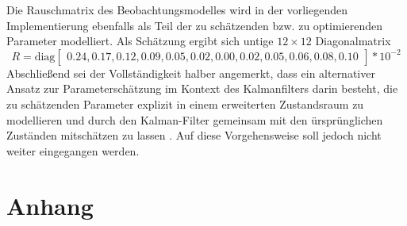 \documentclass[12pt,a4paper,headsepline,bibliography=totoc,listof=totoc,headinclude=false,footinclude=false,BCOR5mm]{scrreprt} %
\begin{document}
Die Rauschmatrix des Beobachtungsmodelles wird in der vorliegenden Implementierung ebenfalls als Teil der zu sch{\"a}tzenden bzw. zu optimierenden Parameter modelliert. Als Sch{\"a}tzung ergibt sich untige $12 \times 12$ Diagonalmatrix
\begin{equation}
R =  \text{diag}\begin{bmatrix}0.24, 0.17, 0.12, 0.09, 0.05, 0.02, 0.00, 0.02, 0.05, 0.06, 0.08, 0.10
  \end{bmatrix} *10^{-2}
\end{equation}
Abschlie{\ss}end sei der Vollst{\"a}ndigkeit halber angemerkt, dass ein alternativer Ansatz zur Parametersch{\"a}tzung im Kontext des Kalmanfilters darin besteht, die zu sch{\"a}tzenden Parameter explizit in einem erweiterten Zustandsraum zu modellieren und durch den Kalman-Filter gemeinsam mit den {\"u}rspr{\"u}nglichen Zust{\"a}nden mitsch{\"a}tzen zu lassen \cite[S. 83ff.]{Mazzoni2007}. Auf diese Vorgehensweise soll jedoch nicht weiter eingegangen werden.



\renewcommand\thechapter{}
\appendix



\chapter{Anhang}\label{anhang}
\lstset{language=Matlab}




\end{document}
